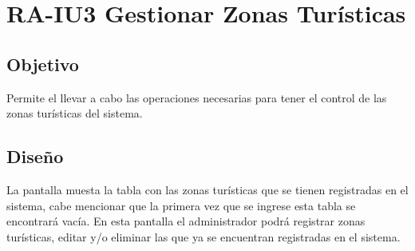 \newpage
\section{RA-IU3 Gestionar Zonas Turísticas}

\subsection{Objetivo}
Permite el llevar a cabo las operaciones necesarias para tener el control de las zonas turísticas del sistema.

\subsection{Diseño}
La pantalla  muesta la tabla con las zonas turísticas que se tienen registradas en el sistema, cabe mencionar que la primera vez que se ingrese esta tabla se encontrará vacía. En esta pantalla el administrador podrá registrar zonas turísticas, editar y/o eliminar las que ya se encuentran registradas en el sistema. 


